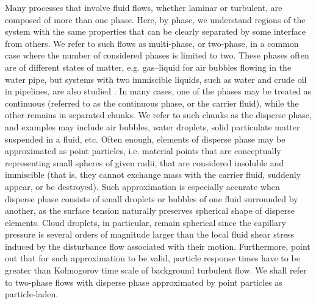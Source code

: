 \documentclass{pracamgren}
\begin{document}
Many processes that involve fluid flows, whether laminar or turbulent, are composed of more than one phase.
Here, by phase, we understand regions of the system with the same properties that can be clearly separated by some interface from others.
We refer to such flows as multi-phase, or two-phase, in a common case where the number of considered phases is limited to two.
These phases often are of different states of matter, e.g. gas--liquid for air bubbles flowing in the water pipe, but systems with two immiscible liquids, such as water and crude oil in pipelines, are also studied \parencite{Brauner2003}.
In many cases, one of the phases may be treated as continuous (referred to as the continuous phase, or the carrier fluid), while the other remains in separated chunks.
We refer to such chunks as the disperse phase, and examples may include air bubbles, water droplets, solid particulate matter suspended in a fluid, etc.
Often enough, elements of disperse phase may be approximated as point particles, i.e. material points that are conceptually representing small spheres of given radii, that are considered insoluble and immiscible (that is, they cannot exchange mass with the carrier fluid, suddenly appear, or be destroyed).
Such approximation is especially accurate when disperse phase consists of small droplets or bubbles of one fluid surrounded by another, as the surface tension naturally preserves spherical shape of disperse elements.
Cloud droplets, in particular, remain spherical since the capillary pressure is several orders of magnitude larger than the local fluid shear stress induced by the disturbance flow associated with their motion.
Furthermore, \textcite[Figure 1, therein]{Balachandar2010} point out that for such approximation to be valid, particle response times have to be greater than Kolmogorov time scale of background turbulent flow. 
We shall refer to two-phase flows with disperse phase approximated by point particles as particle-laden.
\end{document}
